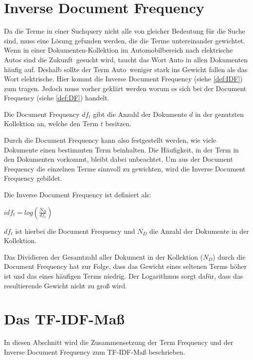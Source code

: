 \section{Inverse Document Frequency}
Da die Terme in einer Suchquery nicht alle von gleicher Bedeutung für die Suche sind, muss eine Lösung gefunden werden, die die Terme untereinander gewichtet. Wenn in einer Dokumenten-Kollektion im Automobilbereich nach \glqq elektrische Autos sind die Zukunft\grqq\ gesucht wird, taucht das Wort Auto in allen Dokumenten häufig auf. Deshalb sollte der Term \glqq Auto\grqq\ weniger stark ins Gewicht fallen als das Wort \glqq elektrische\grqq. Hier kommt die Inverse Document Frequency (siehe \cref{def:IDF}) zum tragen. Jedoch muss vorher geklärt werden worum es sich bei der Document Frequency (siehe \cref{def:DF}) handelt.

\begin{defi}\label{def:DF}
	Die Document Frequency $df_t$ gibt die Anzahl der Dokumente $d$ in der genutzten Kollektion an, welche den Term $t$ besitzen.
\end{defi}
\newpage
Durch die Document Frequency kann also festgestellt werden, wie viele Dokumente einen bestimmten Term beinhalten. Die Häufigkeit, in der Term in den Dokumenten vorkommt, bleibt dabei unbeachtet. Um aus der Document Frequency die einzelnen Terme sinnvoll zu gewichten, wird die Inverse Document Frequency gebildet. 

\begin{defi}\label{def:IDF}
	Die Inverse Document Frequency ist definiert als:
	\begin{center}
		$idf_t = log(\frac{N_D}{df_t})$
	\end{center}
	$df_t$ ist hierbei die Document Frequency und $N_D$ die Anzahl der Dokumente in der Kollektion.
\end{defi}

Das Dividieren der Gesamtzahl aller Dokument in der Kollektion ($N_D$) durch die Document Frequency hat zur Folge, dass das Gewicht eines seltenen Terms höher ist und das eines häufigen Terms niedrig. Der Logarithmus sorgt dafür, dass das resultierende Gewicht nicht zu groß wird.

\section{Das TF-IDF-Maß}

In diesen Abschnitt wird die Zusammensetzung der Term Frequency und der Inverse Document Frequency zum TF-IDF-Maß beschrieben. 

